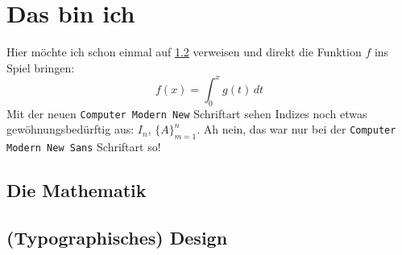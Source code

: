 \chapter{Das bin ich}

Hier möchte ich schon einmal auf \ref{sec:typographisches-design} verweisen und direkt die Funktion \(f\) ins Spiel bringen:
\[
    f(x) = \int_0^x g(t)\, dt
\]
Mit der neuen \texttt{Computer Modern New} Schriftart sehen Indizes noch etwas gewöhnungsbedürftig aus: \(I_n\), \(\{A\}_{m=1}^n\). Ah nein, das war nur bei der \texttt{Computer Modern New Sans} Schriftart so!

\section{Die Mathematik}\label{sec:die-mathematik}

\section{(Typographisches) Design} \label{sec:typographisches-design}
